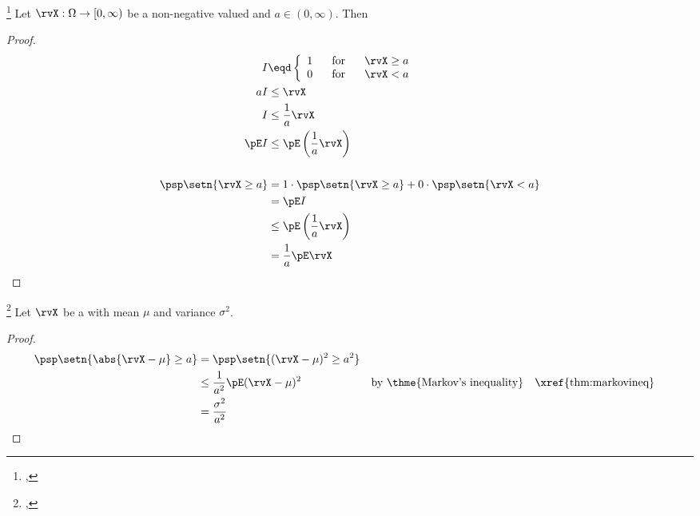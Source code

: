 \begin{theorem}
\footnote{
  ,
  }
\label{thm:markovineq}
Let $\rvX:\Omega\to[0,\infty)$ be a non-negative valued  and
$a\in(0,\infty)$. Then
\end{theorem}
\begin{proof}
\begin{align*}
  I &\eqd \left\{ \begin{array}{l@{\hspace{4ex}\mbox{for}\hspace{4ex}}l}
    1 &\rvX\ge a \\
    0 &\rvX < a
    \end{array}\right.
\\
  aI &\le\rvX           \\
   I &\le \frac{1}{a}\rvX \\
   \pE I &\le \pE\left(\frac{1}{a}\rvX\right) \\
\\
   \psp\setn{\rvX\ge a}
     &= 1\cdot\psp\setn{\rvX\ge a} + 0\cdot\psp\setn{\rvX<a}
   \\&= \pE I
   \\&\le \pE\left(\frac{1}{a}\rvX \right)
   \\&=   \frac{1}{a}\pE\rvX
\end{align*}
\end{proof}

\begin{theorem}
\footnote{
  ,
  }
Let $\rvX$ be a  with mean $\mu$ and variance $\sigma^2$.
\end{theorem}
\begin{proof}
\begin{align*}
  \psp\setn{\abs{\rvX-\mu} \ge a}
    &=   \psp\setn{ (\rvX-\mu)^2 \ge a^2}
  \\&\le \frac{1}{a^2} \pE(\rvX-\mu)^2
    && \text{by \thme{Markov's inequality}}
    && \text{\xref{thm:markovineq}}
  \\&=   \frac{\sigma^2}{a^2}
\end{align*}
\end{proof}

